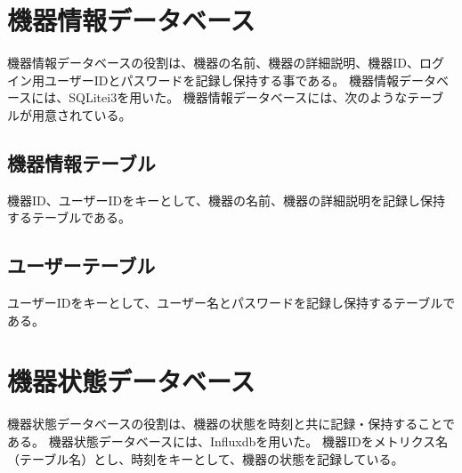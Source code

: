 \section{機器情報データベース}
機器情報データベースの役割は、機器の名前、機器の詳細説明、機器ID、ログイン用ユーザーIDとパスワードを記録し保持する事である。
機器情報データベースには、SQLitei3を用いた。
機器情報データベースには、次のようなテーブルが用意されている。
\subsection{機器情報テーブル}
機器ID、ユーザーIDをキーとして、機器の名前、機器の詳細説明を記録し保持するテーブルである。
\subsection{ユーザーテーブル}
ユーザーIDをキーとして、ユーザー名とパスワードを記録し保持するテーブルである。

\section{機器状態データベース}
機器状態データベースの役割は、機器の状態を時刻と共に記録・保持することである。
機器状態データベースには、Influxdbを用いた。
機器IDをメトリクス名（テーブル名）とし、時刻をキーとして、機器の状態を記録している。

